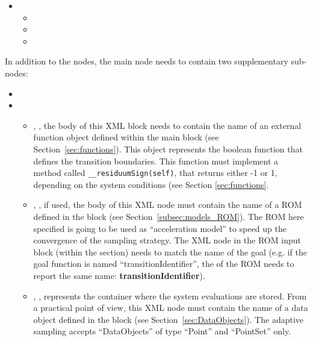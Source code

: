 \begin{itemize}
\item \variableDescription
  \variableChildrenIntro
 \begin{itemize}
    \item \distributionDescription
    \item \functionDescription
    \item \gridDescription
  \end{itemize}
\end{itemize}

 In addition to the  nodes, the main
 node needs to contain two supplementary
sub-nodes:

\begin{itemize}
  \item \convergenceDescription
  \item {}
    \begin{itemize}
      \item {}, ,  the
        body of this XML block needs to contain the name of an external
        function object defined within the  main block (see
        Section~\ref{sec:functions}).
        This object represents the boolean function that defines the transition
        boundaries.
        This function must implement a method called
        \texttt{\_\_residuumSign(self)}, that returns either -1 or 1, depending
        on the system conditions (see Section \ref{sec:functions}.
      \item {}, , if used, the
        body of this XML node must contain the name of a ROM defined in the
         block (see Section~\ref{subsec:models_ROM}). The ROM
        here specified is going to be used as ``acceleration model'' to speed up the
        convergence of the sampling strategy. The  XML node in the ROM
        input block (within the  section) needs to match the name of the goal
         (e.g. if the goal function is named ``transitionIdentifier'', the  of the
        ROM needs to report the same name: \textbf{transitionIdentifier}).
      \item {}, ,
        represents the container where the system evaluations are stored.
        From a practical point of view, this XML node must contain the name of
        a data object defined in the  block (see
        Section~\ref{sec:DataObjects}).
        The adaptive sampling accepts ``DataObjects'' of type ``Point'' and
        ``PointSet'' only.
    \end{itemize}
\end{itemize}



